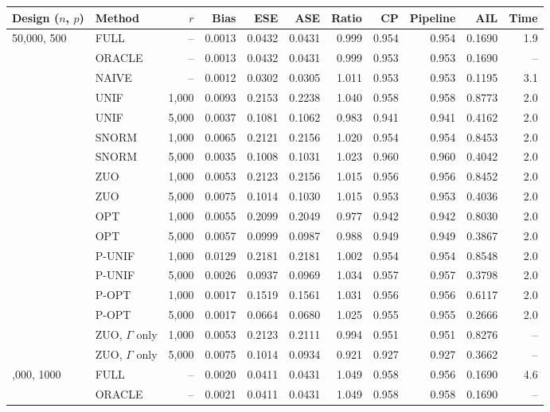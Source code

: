 \begin{tabular}{llrrrrrrrrr}
\toprule
Design (\(n\), \(p\)) & Method & \(r\) & Bias & ESE & ASE & Ratio & CP & Pipeline & AIL & Time\\
\midrule
50,000, 500 & FULL & -- & 0.0013 & 0.0432 & 0.0431 & 0.999 & 0.954 & 0.954 & 0.1690 & 1.9\\
 & ORACLE & -- & 0.0013 & 0.0432 & 0.0431 & 0.999 & 0.953 & 0.953 & 0.1690 & --\\
 & NAIVE & -- & 0.0012 & 0.0302 & 0.0305 & 1.011 & 0.953 & 0.953 & 0.1195 & 3.1\\
 & UNIF & 1,000 & 0.0093 & 0.2153 & 0.2238 & 1.040 & 0.958 & 0.958 & 0.8773 & 2.0\\
 & UNIF & 5,000 & 0.0037 & 0.1081 & 0.1062 & 0.983 & 0.941 & 0.941 & 0.4162 & 2.0\\
 & SNORM & 1,000 & 0.0065 & 0.2121 & 0.2156 & 1.020 & 0.954 & 0.954 & 0.8453 & 2.0\\
 & SNORM & 5,000 & 0.0035 & 0.1008 & 0.1031 & 1.023 & 0.960 & 0.960 & 0.4042 & 2.0\\
 & ZUO & 1,000 & 0.0053 & 0.2123 & 0.2156 & 1.015 & 0.956 & 0.956 & 0.8452 & 2.0\\
 & ZUO & 5,000 & 0.0075 & 0.1014 & 0.1030 & 1.015 & 0.953 & 0.953 & 0.4036 & 2.0\\
 & OPT & 1,000 & 0.0055 & 0.2099 & 0.2049 & 0.977 & 0.942 & 0.942 & 0.8030 & 2.0\\
 & OPT & 5,000 & 0.0057 & 0.0999 & 0.0987 & 0.988 & 0.949 & 0.949 & 0.3867 & 2.0\\
 & P-UNIF & 1,000 & 0.0129 & 0.2181 & 0.2181 & 1.002 & 0.954 & 0.954 & 0.8548 & 2.0\\
 & P-UNIF & 5,000 & 0.0026 & 0.0937 & 0.0969 & 1.034 & 0.957 & 0.957 & 0.3798 & 2.0\\
 & P-OPT & 1,000 & 0.0017 & 0.1519 & 0.1561 & 1.031 & 0.956 & 0.956 & 0.6117 & 2.0\\
 & P-OPT & 5,000 & 0.0017 & 0.0664 & 0.0680 & 1.025 & 0.955 & 0.955 & 0.2666 & 2.0\\
 & ZUO, \(\Gamma\) only & 1,000 & 0.0053 & 0.2123 & 0.2111 & 0.994 & 0.951 & 0.951 & 0.8276 & --\\
 & ZUO, \(\Gamma\) only & 5,000 & 0.0075 & 0.1014 & 0.0934 & 0.921 & 0.927 & 0.927 & 0.3662 & --\\
\addlinespace
50,000, 1000 & FULL & -- & 0.0020 & 0.0411 & 0.0431 & 1.049 & 0.958 & 0.956 & 0.1690 & 4.6\\
 & ORACLE & -- & 0.0021 & 0.0411 & 0.0431 & 1.049 & 0.958 & 0.958 & 0.1690 & --\\

\end{tabular}
